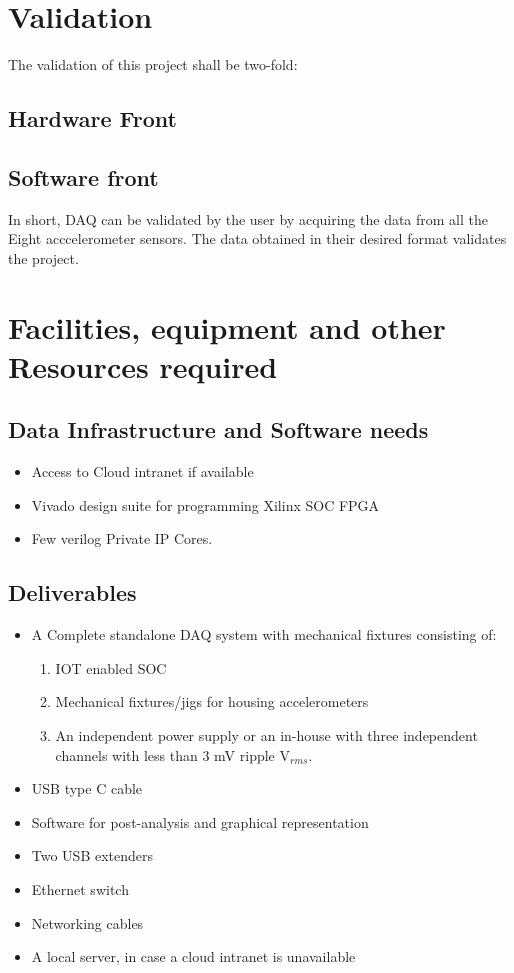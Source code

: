 \documentclass{FR16}
\begin{document}
 \section{Validation}
 The validation of this project shall be two-fold:
 \subsection{Hardware Front}
 
 \subsection{Software front}
 
 
 
In short, DAQ can be validated by the user by acquiring the data from all the Eight acccelerometer sensors. The data obtained in their desired format validates the project.


\newpage
\section{Facilities, equipment and other Resources required}

\subsection{Data Infrastructure and Software needs}
\begin{itemize}
    \item Access to  Cloud intranet if available
    \item Vivado design suite for programming Xilinx SOC FPGA
    \item Few verilog  Private IP Cores.
\end{itemize}


\subsection{Deliverables}

\begin{itemize}
    \item A Complete standalone DAQ system with mechanical fixtures consisting of:
     \begin{enumerate}
         \item IOT enabled SOC 
         \item Mechanical fixtures/jigs for housing accelerometers
         \item An independent power supply or an in-house with three independent channels with less than 3 mV ripple V$_{rms}$.
     \end{enumerate}
    \item USB type C cable
    \item Software for post-analysis and graphical representation
    \item Two USB extenders 
    \item Ethernet switch
    \item Networking cables
    \item A local server, in case a cloud intranet is unavailable
 \end{itemize}
\end{document}
